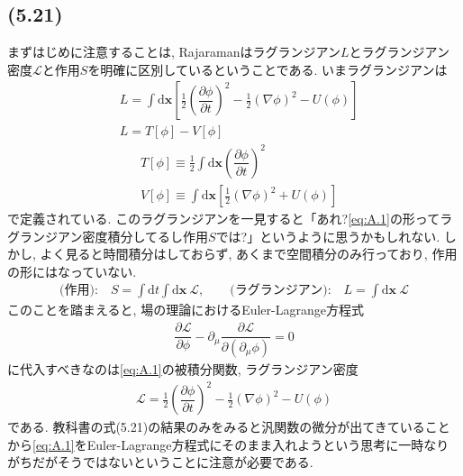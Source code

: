 \documentclass[dvipdfmx,11pt,a4paper,oneside,openany]{jsbook}
\begin{document}
\subsection{(5.21)}
まずはじめに注意することは, Rajaramanはラグランジアン$L$とラグランジアン密度$\mathcal{L}$と作用$S$を明確に区別しているということである. いまラグランジアンは
\setcounter{equation}{18}
\begin{align}
     & L  =\int \mathrm{d}\bm{x}\left[\frac{1}{2}\left(\dfrac{\partial\phi}{\partial t}\right)^2-\frac{1}{2}(\nabla\phi)^2-U(\phi)\right]\tag{A.1}\label{eq:A.1} \\
     & L  =T[\phi]-V[\phi]
\end{align}
\vspace{-11mm}
\begin{subequations}
    \begin{align}
         & T[\phi]\equiv\frac{1}{2}\int\mathrm{d}\bm{x}\left(\dfrac{\partial\phi}{\partial t}\right)^2      \\
         & V[\phi]\equiv\int\mathrm{d}\bm{x}\left[\frac{1}{2}(\nabla \phi)^2+U(\phi)\right]\label{eq:5.20b}
    \end{align}
\end{subequations}
で定義されている. このラグランジアンを一見すると「あれ?\eqref{eq:A.1}の形ってラグランジアン密度積分してるし作用$S$では?」というように思うかもしれない. しかし, よく見ると時間積分はしておらず, あくまで空間積分のみ行っており, 作用の形にはなっていない.
\begin{align*}
    \text{(作用):}\quad S=\int \mathrm{d}t \int\mathrm{d}\bm{x}~ \mathcal{L},\qquad \text{(ラグランジアン):}\quad L=\int\mathrm{d}\bm{x}~\mathcal{L}
\end{align*}
このことを踏まえると, 場の理論におけるEuler-Lagrange方程式
\begin{align*}
    \dfrac{\partial \mathcal{L}}{\partial \phi}-\partial_{\mu}\dfrac{\partial \mathcal{L}}{\partial(\partial_\mu \phi)}=0
\end{align*}
に代入すべきなのは\eqref{eq:A.1}の被積分関数, ラグランジアン密度
\begin{align*}
    \mathcal{L}=\frac{1}{2}\left(\dfrac{\partial\phi}{\partial t}\right)^2-\frac{1}{2}(\nabla\phi)^2-U(\phi)
\end{align*}
である. 教科書の式(5.21)の結果のみをみると汎関数の微分が出てきていることから\eqref{eq:A.1}をEuler-Lagrange方程式にそのまま入れようという思考に一時なりがちだがそうではないということに注意が必要である.
\end{document}
